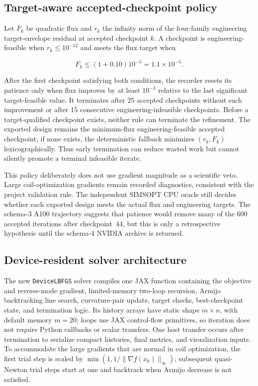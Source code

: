 \documentclass[11pt,a4paper]{article}
\newcommand{\code}[1]{\texttt{#1}}
\begin{document}
\subsection{Target-aware accepted-checkpoint policy}

Let $F_k$ be quadratic flux and $r_k$ the infinity norm of the four-family
engineering target-envelope residual at accepted checkpoint $k$.  A checkpoint
is engineering-feasible when $r_k\leq10^{-12}$ and meets the flux target when

\[
  F_k \leq (1+0.10)10^{-5}=1.1\times10^{-5}.
\]

After the first checkpoint satisfying both conditions, the recorder resets its
patience only when flux improves by at least $10^{-3}$ relative to the last
significant target-feasible value.  It terminates after 25 accepted checkpoints
without such improvement or after 15 consecutive engineering-infeasible
checkpoints.  Before a target-qualified checkpoint exists, neither rule can
terminate the refinement.  The exported design remains the minimum-flux
engineering-feasible accepted checkpoint; if none exists, the deterministic
fallback minimizes $(r_k,F_k)$ lexicographically.  Thus early termination can
reduce wasted work but cannot silently promote a terminal infeasible iterate.

This policy deliberately does not use gradient magnitude as a scientific veto.
Large coil-optimization gradients remain recorded diagnostics, consistent with
the project validation rule.  The independent SIMSOPT CPU oracle still decides
whether each exported design meets the actual flux and engineering targets.
The schema-3 A100 trajectory suggests that patience would remove many of the
600 accepted iterations after checkpoint~44, but this is only a retrospective
hypothesis until the schema-4 NVIDIA archive is returned.

\subsection{Device-resident solver architecture}

The new \code{DeviceLBFGS} solver compiles one JAX function containing the
objective and reverse-mode gradient, limited-memory two-loop recursion, Armijo
backtracking line search, curvature-pair update, target checks, best-checkpoint
state, and termination logic.  Its history arrays have static shape
$m\times n$, with default memory $m=20$; loops use JAX control-flow primitives,
so iteration does not require Python callbacks or scalar transfers.  One host
transfer occurs after termination to serialize compact histories, final
metrics, and visualization inputs.
To accommodate the large gradients that are normal in coil optimization, the
first trial step is scaled by
$\min(1,1/\lVert\nabla f(x_0)\rVert_\infty)$; subsequent quasi-Newton trial
steps start at one and backtrack when Armijo decrease is not satisfied.
\end{document}
